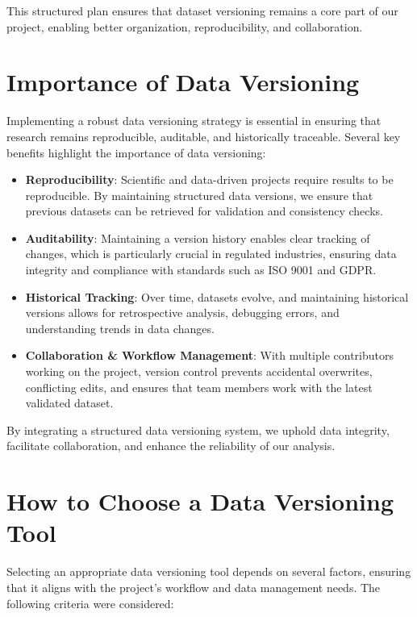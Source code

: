 This structured plan ensures that dataset versioning remains a core part of our project, enabling better organization, reproducibility, and collaboration.

\section{Importance of Data Versioning}
Implementing a robust data versioning strategy is essential in ensuring that research remains reproducible, auditable, and historically traceable. Several key benefits highlight the importance of data versioning:

\begin{itemize}
    \item \textbf{Reproducibility}: Scientific and data-driven projects require results to be reproducible. By maintaining structured data versions, we ensure that previous datasets can be retrieved for validation and consistency checks.
    \item \textbf{Auditability}: Maintaining a version history enables clear tracking of changes, which is particularly crucial in regulated industries, ensuring data integrity and compliance with standards such as ISO 9001 and GDPR.
    \item \textbf{Historical Tracking}: Over time, datasets evolve, and maintaining historical versions allows for retrospective analysis, debugging errors, and understanding trends in data changes.
    \item \textbf{Collaboration \& Workflow Management}: With multiple contributors working on the project, version control prevents accidental overwrites, conflicting edits, and ensures that team members work with the latest validated dataset.
\end{itemize}

By integrating a structured data versioning system, we uphold data integrity, facilitate collaboration, and enhance the reliability of our analysis.

\section{How to Choose a Data Versioning Tool}
Selecting an appropriate data versioning tool depends on several factors, ensuring that it aligns with the project's workflow and data management needs. The following criteria were considered:

